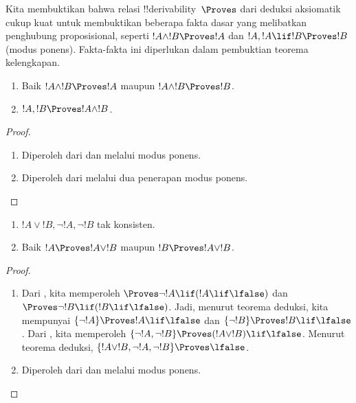 \documentclass[../../../include/open-logic-section]{subfiles}
\begin{document}
      {}
      {}


\begin{explain}
  Kita membuktikan bahwa relasi !!{derivability}~$\Proves$ dari deduksi
  aksiomatik cukup kuat untuk membuktikan beberapa fakta dasar yang
  melibatkan penghubung proposisional, seperti $!A \land !B \Proves !A$
  dan $!A, !A \lif !B \Proves !B$ (modus ponens). Fakta-fakta ini
  diperlukan dalam pembuktian teorema kelengkapan.
\end{explain}

\begin{prop}
  \begin{enumerate}
  \item {} Baik $!A \land !B \Proves
    !A$ maupun $!A \land !B \Proves !B$.
  \item {} $!A, !B \Proves !A \land !B$.
  \end{enumerate}
\end{prop}

\begin{proof}
  \begin{enumerate}
  \item Diperoleh dari  dan
     melalui modus ponens.
  \item Diperoleh dari  melalui dua penerapan
    modus ponens.
  \end{enumerate}
\end{proof}

\begin{prop}
  \begin{enumerate}
  \item $!A \lor !B, \lnot !A, \lnot !B$ tak konsisten.
  \item Baik $!A \Proves !A \lor !B$ maupun $!B \Proves !A \lor !B$.
  \end{enumerate}
\end{prop}

\begin{proof}
  \begin{enumerate}
  \item Dari , kita memperoleh
    $\Proves \lnot !A \lif (!A \lif \lfalse)$ dan
    $\Proves \lnot !B \lif (!B \lif \lfalse)$. Jadi, menurut teorema
    deduksi, kita mempunyai $\{\lnot !A\} \Proves !A \lif \lfalse$
    dan $\{\lnot !B\} \Proves !B \lif \lfalse$. Dari
    , kita memperoleh
    $\{\lnot !A, \lnot !B\} \Proves (!A \lor !B) \lif \lfalse$.
    Menurut teorema deduksi,
    $\{!A \lor !B, \lnot !A, \lnot !B\} \Proves \lfalse$.
  \item Diperoleh dari  dan
     melalui modus ponens.
  \end{enumerate}
\end{proof}
\end{document}
